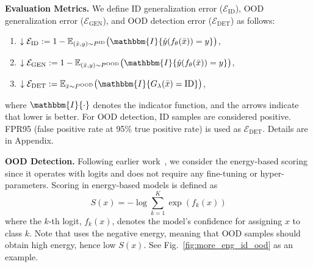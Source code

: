 \textbf{Evaluation Metrics.} We define ID generalization error ($\mathcal{E}_{\text{ID}}$), OOD generalization error ($\mathcal{E}_{\text{GEN}}$), and OOD detection error ($\mathcal{E}_{\text{DET}}$) as follows:
\begin{enumerate}[noitemsep, nolistsep, leftmargin=*]
    \item $\downarrow \mathcal{E}_{\text{ID}} := 1 - \mathbb{E}_{(\bar{x}, y) \sim P^{\text{ID}}} \big(\mathbbm{I}\{\hat{y}(f_\theta(\bar{x})) = y\}\big)$,
    \item $\downarrow \mathcal{E}_{\text{GEN}} := 1 - \mathbb{E}_{(\bar{x}, y) \sim P^{\text{OOD}}} \big(\mathbbm{I}\{\hat{y}(f_\theta(\bar{x})) = y\}\big)$,
    \item $\downarrow \mathcal{E}_{\text{DET}} := \mathbb{E}_{\bar{x} \sim P^{\text{OOD}}} \big(\mathbbm{I}\{G_\lambda(\bar{x}) = \text{ID}\}\big)$,
\end{enumerate}
where $\mathbbm{I}\{\cdot\}$ denotes the indicator function, and the arrows indicate that lower is better. For OOD detection, ID samples are considered positive. FPR95 (false positive rate at 95\% true positive rate) is used as $\mathcal{E}_{\text{DET}}$. Details are in Appendix.


\textbf{OOD Detection.}
Following earlier work~\cite{sun2021react, liu2020energy}, we consider the energy-based scoring~\cite{liu2020energy} since it operates with logits and does not require any fine-tuning or hyper-parameters.
Scoring in energy-based models is defined as  
\begin{equation*}
    S(x) = -\log \sum_{k=1}^K \exp{\left( f_k\left(x\right) \right)}
\end{equation*}
where the \( k \)-th logit, \( f_k(x) \), denotes the model's confidence for assigning \( x \) to class \( k \). Note that \citet{liu2020energy} uses the negative energy, meaning that OOD samples should obtain high energy, hence low $S(x)$. See Fig.~\ref{fig:more_eng_id_ood} as an example.

